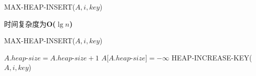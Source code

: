 \documentclass[11pt,UTF8]{ctexart}
\begin{document}
	\begin{algorithm}
	\caption{MAX-HEAP-INSERT($A,i,key$)}
	时间复杂度为\textbf{O($\lg n$)}
	
	MAX-HEAP-INSERT($A,i,key$)
		\begin{algorithmic}[1]
			\State $A.heap$-$size = A.heap$-$size + 1$
			\State $A[A.heap$-$size] = -\infty$
			\State HEAP-INCREASE-KEY($A,i,key$)
		\end{algorithmic}
	\end{algorithm}	
\end{document}
